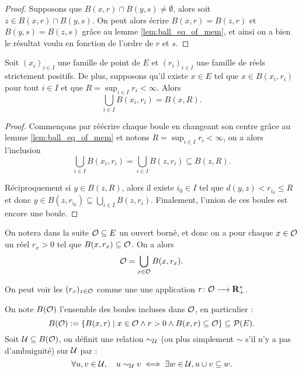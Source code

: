 \documentclass[../../rapport.tex]{subfiles}
\begin{document}
  \begin{proof}
    Supposons que $B(x, r) \cap B(y, s) \not= \emptyset$, alors soit $z \in B(x, r) \cap B(y, s)$.
    On peut alors écrire $B(x, r) = B(z, r)$ et $B(y, s) = B(z, s)$ grâce au lemme \ref{lem:ball_eq_of_mem},
    et ainsi on a bien le résultat voulu en fonction de l'ordre de $r$ et $s$.
  \end{proof}

  \begin{lemma}
    \label{lem:union_mem_balls}
    Soit $(x_i)_{i\in I}$ une famille de point de $E$ et $(r_i)_{i\in I}$ une famille de réels strictement positifs.
    De plus, supposons qu'il existe $x \in E$ tel que $x \in B(x_i, r_i)$ pour tout $i \in I$ et que $R = \sup_{i\in I}{r_i} < \infty$.
    Alors
    $$\bigcup_{i \in I}B(x_i, r_i) = B(x, R).$$
  \end{lemma}

  \begin{proof}
    Commençons par réécrire chaque boule en changeant son centre grâce au lemme \ref{lem:ball_eq_of_mem} et
    notons $R = \sup_{i\in I}{r_i} < \infty$, on a alors l'inclusion
    $$\bigcup_{i\in I}B(x_i, r_i) = \bigcup_{i\in I}{B(z, r_i)} \subseteq B(z, R).$$

    Réciproquement si $y \in B(z, R)$, alors il existe $i_0 \in I$ tel que $d(y, z) < r_{i_0} \le R$
    et donc $y \in B(z, r_{i_0}) \subseteq \bigcup_{i\in I}{B(z, r_i)}$.
    Finalement, l'union de ces boules est encore une boule.
  \end{proof}

  On notera dans la suite $\mathcal{O} \subseteq E$ un ouvert borné,
  et donc on a pour chaque $x \in \mathcal{O}$ un réel $r_x > 0$ tel que $B(x, r_x) \subseteq \mathcal{O}$.
  On a alors
  $$\mathcal{O} = \bigcup_{x\in\mathcal{O}}{B(x, r_x)}.$$

  \begin{remark}
    On peut voir les $(r_x)_{x\in\mathcal{O}}$ comme une une application $r \colon \mathcal{O} \longrightarrow \mathbf R^*_+$.
  \end{remark}

  \begin{definition}
    On note $B(\mathcal{O})$ l'ensemble des boules incluses dans $\mathcal{O}$, en particulier :
    $$B(\mathcal{O}) := \left\{B(x, r) \mid x \in \mathcal{O} \land r > 0 \land B(x, r) \subseteq \mathcal{O}\right\} \subseteq \mathcal{P}(E).$$
    Soit $\mathcal U \subseteq B(\mathcal{O})$, on définit une relation $\sim_{\mathcal U}$ (ou plus simplement $\sim$ s'il n'y a pas d'ambuiguité) sur $\mathcal U$ par :
    $$\forall u, v \in \mathcal U, \hspace{1em} u \sim_{\mathcal U} v \iff \exists w \in \mathcal U, u \cup v \subseteq w.$$
  \end{definition}
\end{document}
